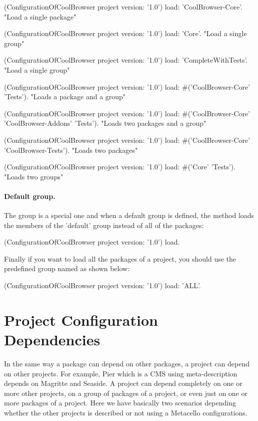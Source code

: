 \documentclass[a4paper,10pt,twoside]{book}
\begin{document}
 
\begin{code}{}
(ConfigurationOfCoolBrowser project version: '1.0') load: 'CoolBrowser-Core'. 
       "Load a single package"

(ConfigurationOfCoolBrowser project version: '1.0') load: 'Core'. 
       "Load a single group"

(ConfigurationOfCoolBrowser project version: '1.0') load: 'CompleteWithTests'.  
       "Load a single group"
 
(ConfigurationOfCoolBrowser project version: '1.0') 
       load: #('CoolBrowser-Core' 'Tests').    
       "Loads a package and a group"

(ConfigurationOfCoolBrowser project version: '1.0') load: #('CoolBrowser-Core' 'CoolBrowser-Addons' 'Tests'). 
       "Loads two packages and a group" 

 (ConfigurationOfCoolBrowser project version: '1.0') load: #('CoolBrowser-Core' 'CoolBrowser-Tests').
       "Loads two packages"
  
(ConfigurationOfCoolBrowser project version: '1.0') load: #('Core' 'Tests'). 
       "Loads two groups"
\end{code}


\paragraph{Default group.} The  group is a special one and when a default group is defined, the  method loads the members of the 'default' group instead of all of the packages:
    
\begin{code}{}
(ConfigurationOfCoolBrowser project version: '1.0') load.
\end{code}

Finally if you want to load all the packages of a project, you should use the predefined group named  as shown below: 

\begin{code}{}
(ConfigurationOfCoolBrowser project version: '1.0') load: 'ALL'.
\end{code}
 

\section{Project Configuration Dependencies}

In the same way a package can depend on other packages, a project can depend on other projects.  For example, Pier which is a CMS using meta-description depends on Magritte and Seaside.  A project can depend completely on one or more other projects, on a group of packages of a project, or even just on one or more packages of a project. Here we have basically two scenarios depending whether the other projects is described or not using a Metacello configurations. 
\end{document}
